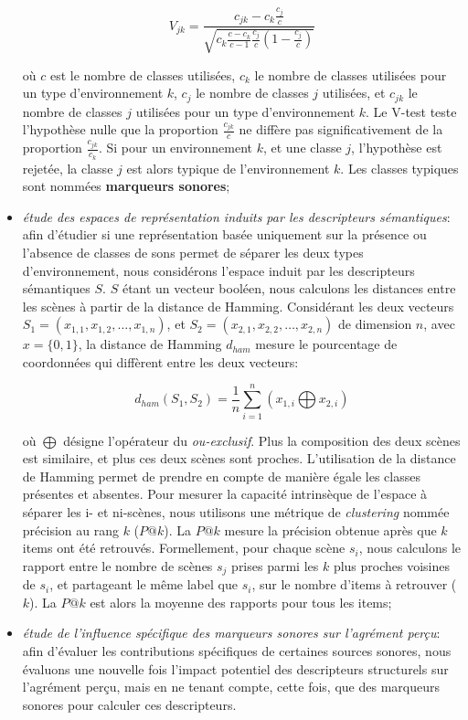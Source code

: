 \begin{itemize}
\begin{equation*}
V_{jk}=\dfrac{c_{jk}-c_k\frac{c_j}{c}}{\sqrt{c_k\frac{c-c_k}{c-1}\frac{c_j}{c}(1-\frac{c_j}{c})}}
\end{equation*}

où $c$ est le nombre de classes utilisées, $c_k$ le nombre de classes utilisées pour un type d'environnement $k$, $c_j$ le nombre de classes $j$ utilisées, et $c_{jk}$ le nombre de classes $j$ utilisées pour un type d'environnement $k$. Le V-test teste l'hypothèse nulle que la proportion $\frac{c_{jk}}{c}$ ne diffère pas significativement de la proportion $\frac{c_{jk}}{c_k}$. Si pour un environnement $k$, et une classe $j$, l'hypothèse est rejetée, la classe $j$ est alors typique de l'environnement $k$. Les classes typiques sont nommées \textbf{marqueurs sonores};

\item \emph{étude des espaces de représentation induits par les descripteurs sémantiques}: afin d'étudier si une représentation basée uniquement sur la présence ou l'absence de classes de sons permet de séparer les deux types d'environnement, nous considérons l'espace induit par les descripteurs sémantiques $S$. $S$ étant un vecteur booléen, nous calculons les distances entre les scènes à partir de la distance de Hamming. Considérant les deux vecteurs $S_1=(x_{1,1},x_{1,2},\ldots,x_{1,n})$, et $S_2=(x_{2,1},x_{2,2},\ldots,x_{2,n})$ de dimension $n$, avec $x=\lbrace 0,1\rbrace$, la distance de Hamming $d_{ham}$ mesure le pourcentage de coordonnées qui diffèrent entre les deux vecteurs:   


\begin{equation*}
d_{ham}(S_1,S_2)=\dfrac{1}{n}\sum_{i=1}^{n} (x_{1,i} \bigoplus x_{2,i})
\end{equation*}

où $\bigoplus$ désigne l'opérateur du \emph{ou-exclusif}. Plus la composition des deux scènes est similaire, et plus ces deux scènes sont proches. L'utilisation de la distance de Hamming permet de prendre en compte de manière égale les classes présentes et absentes. Pour mesurer la capacité intrinsèque de l'espace à séparer les i- et ni-scènes, nous utilisons une métrique de \emph{clustering} nommée précision au rang $k$ ($P@k$). La $P@k$ mesure la précision obtenue après que $k$ items ont été retrouvés. Formellement, pour chaque scène $s_i$, nous calculons le rapport entre le nombre de scènes $s_j$ prises parmi les $k$ plus proches voisines de $s_i$, et partageant le même label que $s_i$, sur le nombre d'items à retrouver ($k$). La $P@k$ est alors la moyenne des rapports pour tous les items;

\item \emph{étude de l'influence spécifique des marqueurs sonores sur l'agrément perçu}: afin d'évaluer les contributions spécifiques de certaines sources sonores, nous évaluons une nouvelle fois l'impact potentiel des descripteurs structurels sur l'agrément perçu, mais en ne tenant compte, cette fois, que des marqueurs sonores pour calculer ces descripteurs.
\end{itemize}

